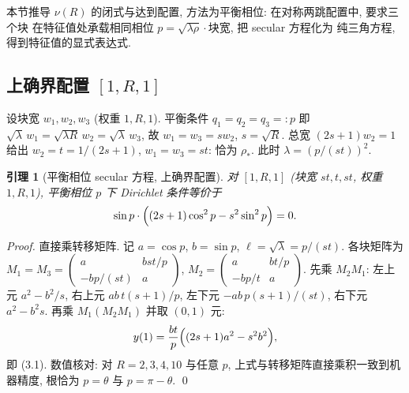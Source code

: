 \documentclass[UTF8]{ctexart}
\newtheorem{lemma}[theorem]{引理}
\begin{document}
本节推导 $\nu(R)$ 的闭式与达到配置, 方法为平衡相位: 在对称两跳配置中, 要求三个块
在特征值处承载相同相位 $p = \sqrt{\lambda\rho}\cdot\text{块宽}$, 把 secular 方程化为
纯三角方程, 得到特征值的显式表达式.

\subsection{上确界配置 \texorpdfstring{$[1,R,1]$}{[1,R,1]}}

设块宽 $w_1, w_2, w_3$ (权重 $1, R, 1$). 平衡条件 $q_1 = q_2 = q_3 =: p$ 即
$\sqrt{\lambda}\,w_1 = \sqrt{\lambda R}\,w_2 = \sqrt{\lambda}\,w_3$, 故 $w_1 = w_3 = s w_2$,
$s = \sqrt{R}$. 总宽 $(2s+1)w_2 = 1$ 给出 $w_2 = t = 1/(2s+1)$, $w_1 = w_3 = st$:
恰为 $\rho_*$. 此时 $\lambda = (p/(st))^2$.

\begin{lemma}[平衡相位 secular 方程, 上确界配置]
对 $[1,R,1]$ (块宽 $st, t, st$, 权重 $1, R, 1$), 平衡相位 $p$ 下 Dirichlet 条件等价于
\begin{equation}
	\sin p \cdot \Bigl( (2s+1)\cos^2 p - s^2 \sin^2 p \Bigr) = 0 .
\end{equation}
\end{lemma}

\begin{proof}
直接乘转移矩阵. 记 $a = \cos p$, $b = \sin p$, $\ell = \sqrt{\lambda} = p/(st)$.
各块矩阵为 $M_1 = M_3 = \begin{pmatrix} a & bst/p \\ -bp/(st) & a \end{pmatrix}$,
$M_2 = \begin{pmatrix} a & bt/p \\ -bp/t & a \end{pmatrix}$.
先乘 $M_2 M_1$: 左上元 $a^2 - b^2/s$, 右上元 $ab\,t(s+1)/p$,
左下元 $-ab\,p(s+1)/(st)$, 右下元 $a^2 - b^2 s$. 再乘 $M_1 (M_2 M_1)$ 并取 $(0,1)$ 元:
\begin{equation}
	y(1) = \frac{b t}{p}\Bigl( (2s+1)a^2 - s^2 b^2 \Bigr),
\end{equation}
即 (3.1). 数值核对: 对 $R = 2, 3, 4, 10$ 与任意 $p$,
上式与转移矩阵直接乘积一致到机器精度, 根恰为 $p = \theta$ 与 $p = \pi - \theta$. \qed
\end{proof}
\end{document}
